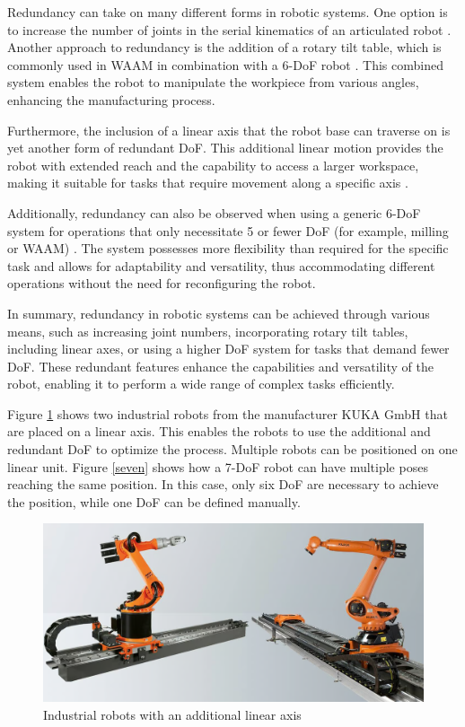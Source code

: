 Redundancy can take on many different forms in robotic systems. One option is to increase the number of joints in the serial kinematics of an articulated robot \cite{Milenkovic.2021}. Another approach to redundancy is the addition of a rotary tilt table, which is commonly used in WAAM in combination with a 6-DoF robot \cite{Yuan.2020}. This combined system enables the robot to manipulate the workpiece from various angles, enhancing the manufacturing process.

Furthermore, the inclusion of a linear axis that the robot base can traverse on is yet another form of redundant DoF. This additional linear motion provides the robot with extended reach and the capability to access a larger workspace, making it suitable for tasks that require movement along a specific axis \cite{Boscariol.2019}.

Additionally, redundancy can also be observed when using a generic 6-DoF system for operations that only necessitate 5 or fewer DoF (for example, milling or WAAM) \cite{Hanafusa.1981,Liu.2022}. The system possesses more flexibility than required for the specific task and allows for adaptability and versatility, thus accommodating different operations without the need for reconfiguring the robot.

In summary, redundancy in robotic systems can be achieved through various means, such as increasing joint numbers, incorporating rotary tilt tables, including linear axes, or using a higher DoF system for tasks that demand fewer DoF. These redundant features enhance the capabilities and versatility of the robot, enabling it to perform a wide range of complex tasks efficiently.

Figure \ref{linear} shows two industrial robots from the manufacturer KUKA GmbH that are placed on a linear axis. This enables the robots to use the additional and redundant DoF to optimize the process. Multiple robots can be positioned on one linear unit. 
Figure \ref{seven} shows how a 7-DoF robot can have multiple poses reaching the same position. In this case, only six DoF are necessary to achieve the position, while one DoF can be defined manually.

\begin{figure}[H]
	\centerline{\includegraphics[scale=.4]{figures/linear.png}}
	\caption{Industrial robots with an additional linear axis \cite{linear}}
	\label{linear}
\end{figure}


